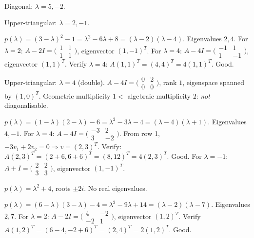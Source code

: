 \begin{solutions}
  \item Diagonal: $\lambda = 5, -2$.
  \item Upper-triangular: $\lambda = 2, -1$.
  \item $p(\lambda) = (3 - \lambda)^{2} - 1 = \lambda^{2} - 6 \lambda + 8 = (\lambda - 2)(\lambda - 4)$. Eigenvalues $2, 4$. For $\lambda = 2$: $A - 2 I = \bigl(\begin{smallmatrix} 1 & 1 \\ 1 & 1 \end{smallmatrix}\bigr)$, eigenvector $(1, -1)^{T}$. For $\lambda = 4$: $A - 4 I = \bigl(\begin{smallmatrix} -1 & 1 \\ 1 & -1 \end{smallmatrix}\bigr)$, eigenvector $(1, 1)^{T}$. Verify $\lambda = 4$: $A(1, 1)^{T} = (4, 4)^{T} = 4 (1, 1)^{T}$. Good.
  \item Upper-triangular: $\lambda = 4$ (double). $A - 4 I = \bigl(\begin{smallmatrix} 0 & 2 \\ 0 & 0 \end{smallmatrix}\bigr)$, rank $1$, eigenspace spanned by $(1, 0)^{T}$. Geometric multiplicity $1 <$ algebraic multiplicity $2$: \emph{not} diagonalisable.
  \item $p(\lambda) = (1 - \lambda)(2 - \lambda) - 6 = \lambda^{2} - 3 \lambda - 4 = (\lambda - 4)(\lambda + 1)$. Eigenvalues $4, -1$.
  For $\lambda = 4$: $A - 4 I = \bigl(\begin{smallmatrix} -3 & 2 \\ 3 & -2 \end{smallmatrix}\bigr)$. From row 1, $-3 v_{1} + 2 v_{2} = 0 \Rightarrow v = (2, 3)^{T}$. Verify: $A(2, 3)^{T} = (2 + 6, 6 + 6)^{T} = (8, 12)^{T} = 4(2, 3)^{T}$. Good.
  For $\lambda = -1$: $A + I = \bigl(\begin{smallmatrix} 2 & 2 \\ 3 & 3 \end{smallmatrix}\bigr)$, eigenvector $(1, -1)^{T}$.
  \item $p(\lambda) = \lambda^{2} + 4$, roots $\pm 2 i$. No real eigenvalues.
  \item $p(\lambda) = (6 - \lambda)(3 - \lambda) - 4 = \lambda^{2} - 9 \lambda + 14 = (\lambda - 2)(\lambda - 7)$. Eigenvalues $2, 7$.
  For $\lambda = 2$: $A - 2 I = \bigl(\begin{smallmatrix} 4 & -2 \\ -2 & 1 \end{smallmatrix}\bigr)$, eigenvector $(1, 2)^{T}$. Verify $A(1, 2)^{T} = (6 - 4, -2 + 6)^{T} = (2, 4)^{T} = 2(1, 2)^{T}$. Good.

\end{solutions}

